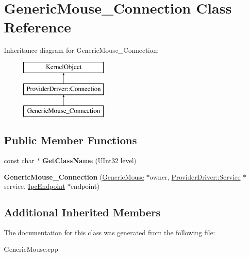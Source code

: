 \hypertarget{class_generic_mouse___connection}{}\section{Generic\+Mouse\+\_\+\+Connection Class Reference}
\label{class_generic_mouse___connection}
Inheritance diagram for Generic\+Mouse\+\_\+\+Connection\+:\begin{figure}[H]
\begin{center}
\leavevmode
\includegraphics[height=3.000000cm]{class_generic_mouse___connection}
\end{center}
\end{figure}
\subsection*{Public Member Functions}
\begin{DoxyCompactItemize}
\item 
\mbox{\label{class_generic_mouse___connection_ac83b2829d1695736efeba196801417e3}} 
const char $\ast$ {\bfseries Get\+Class\+Name} (U\+Int32 level)
\item 
\mbox{\label{class_generic_mouse___connection_a60596cad7925599c80788e28f33c2584}} 
{\bfseries Generic\+Mouse\+\_\+\+Connection} (\hyperlink{class_generic_mouse}{Generic\+Mouse} $\ast$owner, \hyperlink{class_provider_driver_1_1_service}{Provider\+Driver\+::\+Service} $\ast$service, \hyperlink{class_ipc_endpoint}{Ipc\+Endpoint} $\ast$endpoint)
\end{DoxyCompactItemize}
\subsection*{Additional Inherited Members}


The documentation for this class was generated from the following file\+:\begin{DoxyCompactItemize}
\item 
Generic\+Mouse.\+cpp\end{DoxyCompactItemize}
